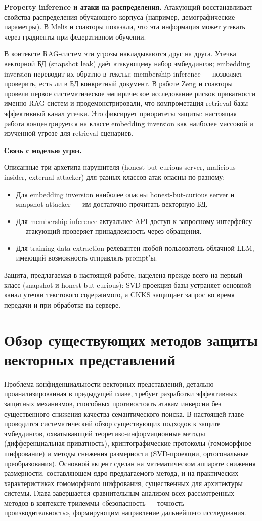 \documentclass[a4paper, 12pt, oneside, openany]{article}
\newcounter{chap}
\newcommand{\chapsection}[1]{%
  \refstepcounter{chap}%
  \setcounter{equation}{0}%
  \setcounter{table}{0}%
  \setcounter{figure}{0}%
  \section{#1}%
}
\begin{document}
\textbf{Property inference и атаки на распределения.} Атакующий восстанавливает свойства распределения обучающего корпуса (например, демографические параметры). В \cite{ref43} Melis и соавторы показали, что эта информация может утекать через градиенты при федеративном обучении.

В контексте RAG-систем эти угрозы накладываются друг на друга. Утечка векторной БД (snapshot leak) даёт атакующему набор эмбеддингов; embedding inversion переводит их обратно в тексты; membership inference --- позволяет проверить, есть ли в БД конкретный документ. В работе \cite{ref45} Zeng и соавторы провели первое систематическое эмпирическое исследование рисков приватности именно RAG-систем и продемонстрировали, что компрометация retrieval-базы --- эффективный канал утечки. Это фиксирует приоритеты защиты: настоящая работа концентрируется на классе embedding inversion как наиболее массовой и изученной угрозе для retrieval-сценариев.

\textbf{Связь с моделью угроз.}

 Описанные три архетипа нарушителя (honest-but-curious server, malicious insider, external attacker) для разных классов атак опасны по-разному:
\begin{itemize}
	\item Для embedding inversion наиболее опасны honest-but-curious server и snapshot attacker --- им достаточно прочитать векторную БД.
	\item Для membership inference актуальнее API-доступ к запросному интерфейсу --- атакующий проверяет принадлежность через обращения.
	\item Для training data extraction релевантен любой пользователь облачной LLM, имеющий возможность отправлять prompt'ы.
\end{itemize}
Защита, предлагаемая в настоящей работе, нацелена прежде всего на первый класс (snapshot и honest-but-curious): SVD-проекция базы устраняет основной канал утечки текстового содержимого, а CKKS защищает запрос во время передачи и при обработке на сервере. 

\chapsection{Обзор существующих методов защиты векторных представлений}

Проблема конфиденциальности векторных представлений, детально проанализированная в предыдущей главе, требует разработки эффективных защитных механизмов, способных противостоять атакам инверсии без существенного снижения качества семантического поиска. В настоящей главе проводится систематический обзор существующих подходов к защите эмбеддингов, охватывающий теоретико-информационные методы (дифференциальная приватность), криптографические протоколы (гомоморфное шифрование) и методы снижения размерности (SVD-проекции, ортогональные преобразования). Основной акцент сделан на математическом аппарате снижения размерности, составляющем ядро предлагаемого метода, и на практических характеристиках гомоморфного шифрования, существенных для архитектуры системы. Глава завершается сравнительным анализом всех рассмотренных методов в контексте трилеммы «безопасность --- точность --- производительность», формирующим направление дальнейшего исследования.
\end{document}
